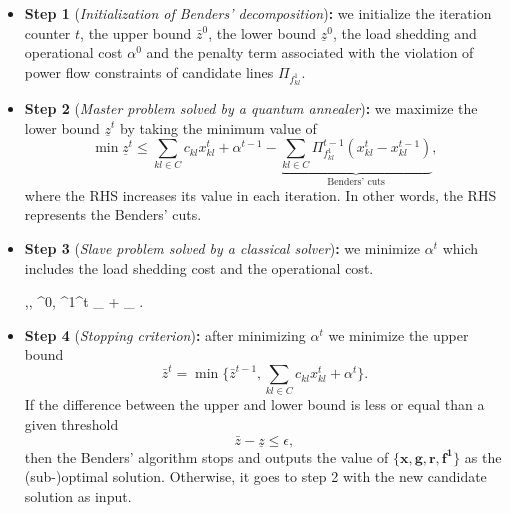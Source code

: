 \begin{itemize}
    \item \textbf{Step 1} (\textit{Initialization of Benders’ decomposition})\textbf{:} we initialize the iteration counter $t$, the upper bound $\bar{z}^{0}$, the lower bound $\underline{z}^{0}$, the load shedding and operational cost $\alpha^{0}$ and the penalty term associated with the violation of power flow constraints of candidate lines $\Pi_{f_{kl}^{1}}$.
    \item \textbf{Step 2} (\textit{Master problem solved by a quantum annealer})\textbf{:} we maximize the lower bound $\underline{z}^{t}$ by taking the minimum value of 
    \begin{equation}
      \min \underline{z}^{t} \leq \sum_{kl\in C}c_{kl}x_{kl}^{t} + \alpha^{t-1} - \underbrace{\sum_{kl\in C}\Pi^{t-1}_{f_{kl}^{1}}\left(x_{kl}^{t} - x_{kl}^{t-1}\right)}_{\text{Benders' cuts}},  
    \end{equation}
    where the RHS increases its value in each iteration. In other words, the RHS represents the Benders' cuts.
    \item \textbf{Step 3} (\textit{Slave problem solved by a classical solver})\textbf{:} we minimize $\alpha^{t}$ which includes the load shedding cost and the operational cost.
    \begin{mini!}[2]
	{,, ^{0}, ^{1}}{\alpha^{t} \equiv {}_{} + _{}}{}{}{}
    .
    \end{mini!}
    \item \textbf{Step 4} (\textit{Stopping criterion})\textbf{:} after minimizing $\alpha^{t}$ we minimize the upper bound
    \begin{equation}
        \bar{z}^{t} = \min \{\bar{z}^{t-1}, \sum_{kl \in C}c_{kl}x_{kl}^{t} + \alpha^{t}\}.
    \end{equation}
    If the difference between the upper and lower bound is less or equal than a given threshold
    \begin{equation}
        \bar{z} - \underline{z} \leq \epsilon,
    \end{equation}
    then the Benders' algorithm stops and outputs the value of $\{\mathbf{x},\mathbf{g},\mathbf{r},\mathbf{f^{1}}\}$ as the (sub-)optimal solution. Otherwise, it goes to step 2 with the new candidate solution as input.
\end{itemize}

